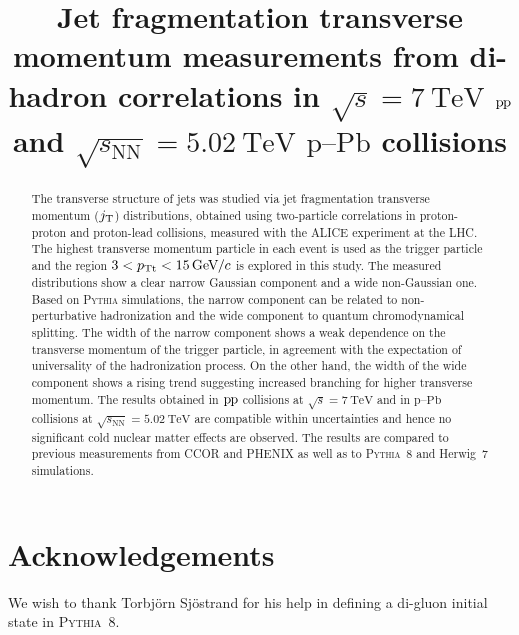 \documentclass[ALICE,manyauthors]{cernphprep}
\newcommand{\pp}{\ensuremath{\mbox{p\kern-0.05em p}}}
\newcommand{\pPb}{\ensuremath{\mbox{p--Pb}}}
\newcommand{\sqrtS}{\ensuremath{\sqrt{s}}}
\newcommand{\sqrtSnn}{\ensuremath{\sqrt{s_{\mathrm{NN}}}}}
\newcommand{\sqrtSE}[2][TeV]{\ensuremath{\sqrtS = #2~\mathrm{#1}}}
\newcommand{\sqrtSnnE}[2][TeV]{\ensuremath{\sqrtSnn = #2~\mathrm{#1}}}
\newcommand{\GeVc}{\ensuremath{\mathrm{GeV}\kern-0.05em/\kern-0.02em c}}
\def\pt#1{\ensuremath{p_{\rm T#1}}}
\def\jt#1{\ensuremath{j_{\rm T#1}}}
\begin{document}
\begin{titlepage}
%
%

\title{Jet fragmentation transverse momentum measurements from di-hadron correlations in $\sqrtSE{7}$ $\pp$ and $\sqrtSnnE{5.02}$ $\pPb$ collisions}


\begin{abstract}
The transverse structure of jets was studied via jet fragmentation transverse momentum ($\jt{}$) distributions, obtained using two-particle correlations in proton-proton and proton-lead collisions, measured with the ALICE experiment at the LHC. The highest transverse momentum particle in each event is used as the trigger particle and the region $3 < \pt{t} < 15\,\GeVc$ is explored in this study. The measured distributions show a clear narrow Gaussian component and a wide non-Gaussian one. Based on \textsc{Pythia} simulations, the narrow component can be related to non-perturbative hadronization and the wide component to quantum chromodynamical splitting. The width of the narrow component shows a weak dependence on the transverse momentum of the trigger particle, in agreement with the expectation of universality of the hadronization process. On the other hand, the width of the wide component shows a rising trend suggesting increased branching for higher transverse momentum. The results obtained in $\pp$ collisions at $\sqrtSE{7}$ and in $\pPb$ collisions at $\sqrtSnnE{5.02}$ are compatible within uncertainties and hence no significant cold nuclear matter effects are observed. The results are compared to previous measurements from CCOR and PHENIX as well as to \textsc{Pythia}~8 and Herwig~7 simulations.
\end{abstract}
\end{titlepage}
\setcounter{page}{2}

 


\newenvironment{acknowledgement}{\relax}{\relax}
\begin{acknowledgement}
\section*{Acknowledgements}
We wish to thank Torbjörn Sjöstrand for his help in defining a di-gluon initial state in \textsc{Pythia}~8.
\end{acknowledgement}
\end{document}
